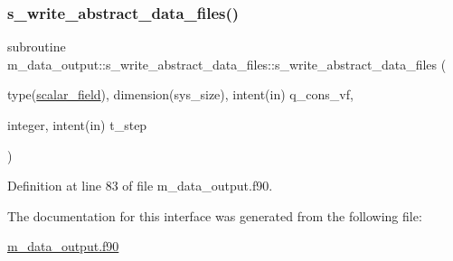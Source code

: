 \subsubsection{\texorpdfstring{s\+\_\+write\+\_\+abstract\+\_\+data\+\_\+files()}{s\_write\_abstract\_data\_files()}}
{\footnotesize\ttfamily subroutine m\+\_\+data\+\_\+output\+::s\+\_\+write\+\_\+abstract\+\_\+data\+\_\+files\+::s\+\_\+write\+\_\+abstract\+\_\+data\+\_\+files (\begin{DoxyParamCaption}\item[{type(\hyperlink{structm__derived__types_1_1scalar__field}{scalar\+\_\+field}), dimension(sys\+\_\+size), intent(in)}]{q\+\_\+cons\+\_\+vf,  }\item[{integer, intent(in)}]{t\+\_\+step }\end{DoxyParamCaption})}



Definition at line 83 of file m\+\_\+data\+\_\+output.\+f90.



The documentation for this interface was generated from the following file\+:\begin{DoxyCompactItemize}
\item 
\hyperlink{m__data__output_8f90}{m\+\_\+data\+\_\+output.\+f90}\end{DoxyCompactItemize}
